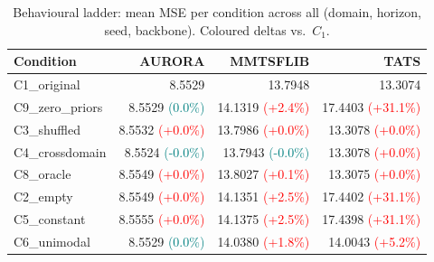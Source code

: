 \begin{table}[t]
\caption{Behavioural ladder: mean MSE per condition across all (domain, horizon, seed, backbone). Coloured deltas vs.\ $C_1$.}
\label{tab:ladder}
\centering
\small
\begin{tabular}{lrrr}
\toprule
Condition & AURORA & MMTSFLIB & TATS \\
\midrule
C1\_original & 8.5529 & 13.7948 & 13.3074 \\
C9\_zero\_priors & 8.5529 {\tiny\textcolor{teal}{(0.0\%)}} & 14.1319 {\tiny\textcolor{red}{(+2.4\%)}} & 17.4403 {\tiny\textcolor{red}{(+31.1\%)}} \\
C3\_shuffled & 8.5532 {\tiny\textcolor{red}{(+0.0\%)}} & 13.7986 {\tiny\textcolor{red}{(+0.0\%)}} & 13.3078 {\tiny\textcolor{red}{(+0.0\%)}} \\
C4\_crossdomain & 8.5524 {\tiny\textcolor{teal}{(-0.0\%)}} & 13.7943 {\tiny\textcolor{teal}{(-0.0\%)}} & 13.3078 {\tiny\textcolor{red}{(+0.0\%)}} \\
C8\_oracle & 8.5549 {\tiny\textcolor{red}{(+0.0\%)}} & 13.8027 {\tiny\textcolor{red}{(+0.1\%)}} & 13.3075 {\tiny\textcolor{red}{(+0.0\%)}} \\
C2\_empty & 8.5549 {\tiny\textcolor{red}{(+0.0\%)}} & 14.1351 {\tiny\textcolor{red}{(+2.5\%)}} & 17.4402 {\tiny\textcolor{red}{(+31.1\%)}} \\
C5\_constant & 8.5555 {\tiny\textcolor{red}{(+0.0\%)}} & 14.1375 {\tiny\textcolor{red}{(+2.5\%)}} & 17.4398 {\tiny\textcolor{red}{(+31.1\%)}} \\
C6\_unimodal & 8.5529 {\tiny\textcolor{teal}{(0.0\%)}} & 14.0380 {\tiny\textcolor{red}{(+1.8\%)}} & 14.0043 {\tiny\textcolor{red}{(+5.2\%)}} \\
\bottomrule
\end{tabular}
\end{table}
